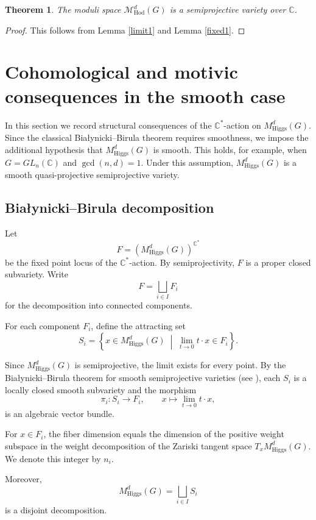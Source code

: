 \documentclass[11pt, reqno]{amsart}
\numberwithin{equation}{section}
\newtheorem{theorem}{Theorem}[section]
\theoremstyle{definition}
\begin{document}
\begin{theorem}\label{Hodge}
The moduli space $\mathcal{M}^{d}_\mathrm{Hod}(G)$ is a semiprojective variety over $\mathbb{C}$.
\end{theorem}
\begin{proof}
    This follows from Lemma \ref{limit1} and Lemma \ref{fixed1}.
\end{proof}

\section{Cohomological and motivic consequences in the smooth case}

In this section we record structural consequences of the
$\mathbb{C}^\ast$-action on $M^d_{\mathrm{Higgs}}(G)$.
Since the classical Białynicki--Birula theorem requires smoothness,
we impose the additional hypothesis that
$M^d_{\mathrm{Higgs}}(G)$ is smooth. This holds, for example, when $G = GL_n(\mathbb{C})$  and
$\gcd(n,d)=1$. Under this assumption, $M^d_{\mathrm{Higgs}}(G)$ is a smooth
quasi-projective semiprojective variety.

\subsection*{Białynicki--Birula decomposition}

Let
\[
F = \left(M^d_{\mathrm{Higgs}}(G)\right)^{\mathbb{C}^\ast}
\]
be the fixed point locus of the $\mathbb{C}^\ast$-action.
By semiprojectivity, $F$ is a proper closed subvariety.
Write
\[
F = \bigsqcup_{i\in I} F_i
\]
for the decomposition into connected components.

For each component $F_i$, define the attracting set
\[
S_i =
\left\{
x \in M^d_{\mathrm{Higgs}}(G)
\;\middle|\;
\lim_{t\to 0} t\cdot x \in F_i
\right\}.
\]

Since $M^d_{\mathrm{Higgs}}(G)$ is semiprojective,
the limit exists for every point.
By the Białynicki--Birula theorem for smooth
semiprojective varieties (see
\cite{BB73, HT03}),
each $S_i$ is a locally closed smooth subvariety and
the morphism
\[
\pi_i : S_i \longrightarrow F_i,
\qquad
x \longmapsto \lim_{t\to 0} t\cdot x,
\]
is an algebraic vector bundle.

For $x \in F_i$, the fiber dimension equals the
dimension of the positive weight subspace in the
weight decomposition of the Zariski tangent space
$T_x M^d_{\mathrm{Higgs}}(G)$.
We denote this integer by $n_i$.

Moreover,
\[
M^d_{\mathrm{Higgs}}(G)
=
\bigsqcup_{i\in I} S_i
\]
is a disjoint decomposition.
\end{document}
